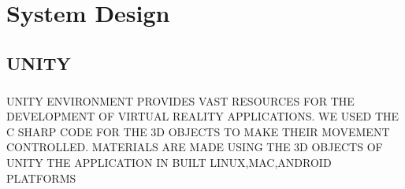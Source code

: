 \chapter{System Design}
\section{UNITY}
\paragraph{} UNITY ENVIRONMENT PROVIDES VAST RESOURCES FOR THE DEVELOPMENT OF VIRTUAL REALITY APPLICATIONS.
WE USED THE C SHARP CODE FOR THE 3D OBJECTS TO MAKE THEIR MOVEMENT CONTROLLED.
MATERIALS ARE MADE USING THE 3D OBJECTS OF UNITY
THE APPLICATION IN BUILT LINUX,MAC,ANDROID PLATFORMS
